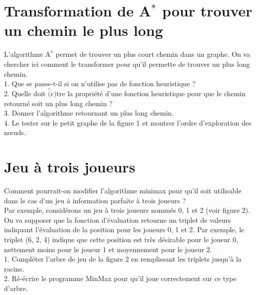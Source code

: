 \documentclass[12pt,a4paper, france]{article}
\newcommand\tab[1][1cm]{\hspace*{#1}}
\begin{document}
\section{Transformation de A${^*}$ pour trouver un chemin le plus long}

L\textquoteright algorithme A${^*}$  permet de trouver un plus court chemin dans un graphe. On va chercher ici
comment le transformer pour qu\textquoteright il permette de trouver un plus long chemin. \\

1. Que se passe-t-il si on n\textquoteright utilise pas de fonction heuristique ? \\
\tab 2. Quelle doit ${\hat(e)}$tre la propri\'et\'e d\textquoteright une fonction heuristique pour que le chemin retourn\'e soit un plus long chemin ? \\
\tab 3. Donner l\textquoteright algorithme retournant un plus long chemin. \\
\tab 4. Le tester sur le petit graphe de la figure 1 et montrer l\textquoteright ordre d\textquoteright exploration des nœuds. \\

\section{Jeu à trois joueurs}

Comment pourrait-on modifier l\textquoteright algorithme minimax pour qu\textquoteright il soit utilisable dans le cas d\textquoteright un jeu \`a information parfaite \`a trois joueurs ? \\
Par exemple, consid\'erons un jeu \`a trois joueurs nomm\'es 0, 1 et 2 (voir figure 2). On va supposer que la fonction d\textquoteright \'evaluation retourne un triplet de valeurs indiquant l\textquoteright \'evaluation de la position pour les joueurs 0, 1 et 2. Par exemple, le triplet (6, 2, 4) indique que cette position est tr\`es d\'esirable pour le joueur 0, nettement moins pour le joueur 1 et moyennement pour le joueur 2.\\

1. Compl\'eter l’arbre de jeu de la figure 2 en remplissant les triplets jusqu\textquoteright \`a la racine.\\
\tab 2. R\'e-\'ecrire le programme MinMax pour qu\textquoteright il joue correctement sur ce type d\textquoteright arbre. \\
\end{document}
